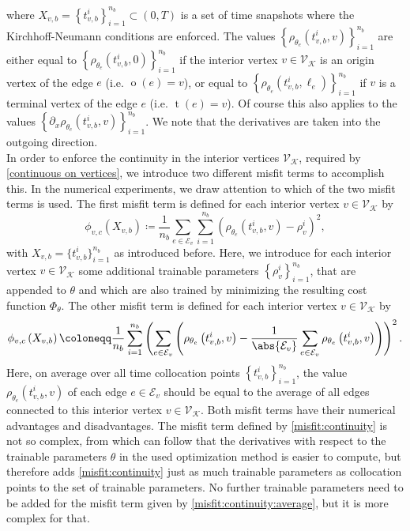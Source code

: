 where $X_{v,b} = \left\{ t_{v,b}^i \right\}_{i=1}^{n_b} \subset \left( 0,T \right)$ is a set of time snapshots where the Kirchhoff-Neumann conditions are enforced. The values $\left\{ \rho_{\theta_e}  \left( t_{v,b}^i, v \right) \right\}_{i=1}^{n_b}$ are either equal to $\left\{ \rho_{\theta_e}  \left( t_{v,b}^i, 0 \right) \right\}_{i=1}^{n_b}$ if the interior vertex $v \in \mathcal{V}_\mathcal{K}$ is an origin vertex of the edge $e$ (i.e. $\operatorname{o}(e) = v$), or equal to $\left\{ \rho_{\theta_e}  \left( t_{v,b}^i, \ell_e \right) \right\}_{i=1}^{n_b}$ if $v$ is a terminal vertex of the edge $e$ (i.e. $\operatorname{t}(e) = v$). Of course this also applies to the values $\left\{ \partial_x \rho_{\theta_e}  \left( t_{v,b}^i, v \right) \right\}_{i=1}^{n_b}$. We note that the derivatives are taken into the outgoing direction. \\
In order to enforce the continuity in the interior vertices $\mathcal{V}_\mathcal{K}$, required by \cref{continuous on vertices}, we introduce two different misfit terms to accomplish this. In the numerical experiments, we draw attention to which of the two misfit terms is used. The first misfit term is defined for each interior vertex $v \in \mathcal{V}_\mathcal{K}$ by 
\begin{equation} 
    \label{misfit:continuity}
    \phi_{v,c}  \left( X_{v,b} \right) \coloneqq \frac{1}{n_b} \sum_{e \in \mathcal{E}_v} \sum_{i=1}^{n_b} \left(  \rho_{\theta_e}  \left( t_{v,b}^i, v \right) - \rho_{v}^i \right)^2,
\end{equation} 
with $X_{v,b} = \{t_{v,b}^i\}_{i=1}^{n_b}$ as introduced before. Here, we introduce for each interior vertex $v \in \mathcal{V}_\mathcal{K}$ some additional trainable parameters $\left\{ \rho_{v}^i \right\}_{i=1}^{n_b}$, that are appended to $\theta$ and which are also trained by minimizing the resulting cost function $\Phi_\theta$. The other misfit term is defined for each interior vertex $v \in \mathcal{V}_\mathcal{K}$ by 
\begin{equation} 
    \label{misfit:continuity:average}
    \phi_{v,c}  \left( X_{v,b} \right) \coloneqq \frac{1}{n_b}  \sum_{i=1}^{n_b} \left( \sum_{e \in \mathcal{E}_v} \left( \rho_{\theta_e}  \left( t_{v,b}^i, v \right) - \frac{1}{\abs{\mathcal{E}_v}} \sum_{e \in \mathcal{E}_v} \rho_{\theta_e}  \left( t_{v,b}^i, v \right) \right) \right)^2.
\end{equation}
Here, on average over all time collocation points $\left\{ t_{v,b}^i \right\}_{i=1}^{n_b}$, the value $\rho_{\theta_e}  \left( t_{v,b}^i, v \right)$ of each edge $e \in \mathcal{E}_v$ should be equal to the average of all edges connected to this interior vertex $v \in \mathcal{V}_\mathcal{K}$. Both misfit terms have their numerical advantages and disadvantages. The misfit term defined by \cref{misfit:continuity} is not so complex, from which can follow that the derivatives with respect to the trainable parameters $\theta$ in the used optimization method is easier to compute, but therefore adds \cref{misfit:continuity} just as much trainable parameters as collocation points to the set of trainable parameters. No further trainable parameters need to be added for the misfit term given by \cref{misfit:continuity:average}, but it is more complex for that. \\
